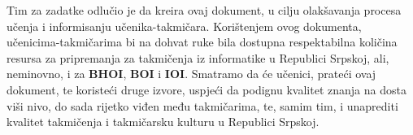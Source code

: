 \hspace{2em} Tim za zadatke odlučio je da kreira ovaj dokument, u cilju olakšavanja procesa učenja i informisanju učenika-takmičara. Korištenjem ovog dokumenta, učenicima-takmičarima bi na dohvat ruke bila dostupna respektabilna količina resursa za pripremanja za takmičenja iz informatike u Republici Srpskoj, ali, neminovno, i za \textbf{BHOI}, \textbf{BOI} i \textbf{IOI}.
Smatramo da će učenici, prateći ovaj dokument, te koristeći druge izvore, uspjeći da podignu kvalitet znanja na dosta viši nivo, do sada rijetko viđen među takmičarima, te, samim tim, i unaprediti kvalitet takmičenja i takmičarsku kulturu u Republici Srpskoj.